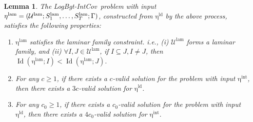 \documentclass[11pt,a4paper]{article} \usepackage{enumitem}
\newcommand{\calU}{\mathcal{U}}
\newcommand{\LBOintcov}{\textsf{LogBgt-IntCov}}
\newcommand{\inteta}{\operatorname{\eta^{int}}}
\newcommand{\ldeta}{\operatorname{\eta^{ld}}}
\newcommand{\lamU}{\operatorname{\calU^{lam}}}
\newcommand{\lamS}[1]{\ifx\relax#1\relax
    S^{\operatorname{lam}}
  \else
    S^{\operatorname{lam}}_{#1} 
  \fi
}
\newcommand{\lameta}{\operatorname{\eta^{lam}}}
\newcommand{\Lev}{\operatorname{Id}}
\newtheorem{lemma}[theorem]{Lemma}
\theoremstyle{definition}
\begin{document}
\begin{lemma}\label{lem:inter-convert-2}
The \LBOintcov\ problem with input $\lameta = (\lamU; \lamS{1}, \ldots, \lamS{T}; \Gamma)$, constructed from $\ldeta$ by the above process, satisfies the following properties:

\begin{enumerate}[label=(\alph*), format=\normalfont]
\item $\lameta$ satisfies the laminar family constraint. i.e., (i) $\lamU$ forms a laminar family, and (ii) $\forall I, J \in \lamU$, if $I \subseteq J,I\neq J$, then $\Lev(\lameta; I) < \Lev(\lameta; J)$.

\item For any $c \geq 1$, if there exists a $c$-valid solution for the problem with input $\inteta$, then there exists a $3c$-valid solution for $\ldeta$. 

\item For any $c_0 \geq 1$, if there exists a $c_0$-valid solution for the problem with input $\ldeta$, then there exists a $4c_0$-valid solution for $\inteta$.
\end{enumerate}
\end{lemma}
\end{document}

